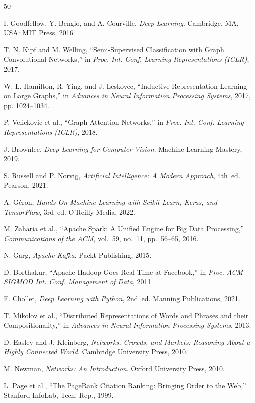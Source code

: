 \documentclass[conference]{IEEEtran}
\begin{document}
\begin{thebibliography}{50}

I. Goodfellow, Y. Bengio, and A. Courville, \textit{Deep Learning}. Cambridge, MA, USA: MIT Press, 2016.

T. N. Kipf and M. Welling, ``Semi-Supervised Classification with Graph Convolutional Networks,'' in \textit{Proc. Int. Conf. Learning Representations (ICLR)}, 2017.

W. L. Hamilton, R. Ying, and J. Leskovec, ``Inductive Representation Learning on Large Graphs,'' in \textit{Advances in Neural Information Processing Systems}, 2017, pp. 1024--1034.

P. Velickovic et al., ``Graph Attention Networks,'' in \textit{Proc. Int. Conf. Learning Representations (ICLR)}, 2018.

J. Brownlee, \textit{Deep Learning for Computer Vision}. Machine Learning Mastery, 2019.

S. Russell and P. Norvig, \textit{Artificial Intelligence: A Modern Approach}, 4th~ed. Pearson, 2021.

A. G\'{e}ron, \textit{Hands-On Machine Learning with Scikit-Learn, Keras, and TensorFlow}, 3rd~ed. O'Reilly Media, 2022.

M. Zaharia et al., ``Apache Spark: A Unified Engine for Big Data Processing,'' \textit{Communications of the ACM}, vol.~59, no.~11, pp.~56--65, 2016.

N. Garg, \textit{Apache Kafka}. Packt Publishing, 2015.

D. Borthakur, ``Apache Hadoop Goes Real-Time at Facebook,'' in \textit{Proc. ACM SIGMOD Int. Conf. Management of Data}, 2011.

F. Chollet, \textit{Deep Learning with Python}, 2nd~ed. Manning Publications, 2021.

T. Mikolov et al., ``Distributed Representations of Words and Phrases and their Compositionality,'' in \textit{Advances in Neural Information Processing Systems}, 2013.

D. Easley and J. Kleinberg, \textit{Networks, Crowds, and Markets: Reasoning About a Highly Connected World}. Cambridge University Press, 2010.

M. Newman, \textit{Networks: An Introduction}. Oxford University Press, 2010.

L. Page et al., ``The PageRank Citation Ranking: Bringing Order to the Web,'' Stanford InfoLab, Tech. Rep., 1999.


\end{thebibliography}
\end{document}
